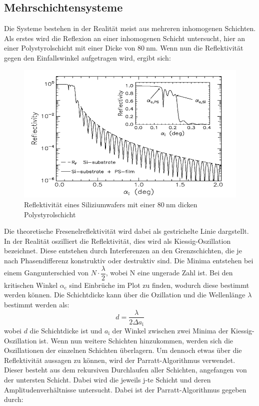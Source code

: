 \subsection{Mehrschichtensysteme}
\label{sec:Mehrschichtensysteme}
Die Systeme bestehen in der Realität meist aus mehreren inhomogenen Schichten. Als erstes wird die Reflexion an einer inhomogenen Schicht untersucht, hier an einer Polystyrolschicht mit einer Dicke von $\SI{80}{\nano\meter}$. Wenn nun die Reflektivität gegen den Einfallswinkel aufgetragen wird, ergibt sich:
\begin{figure}[h!]
  \label{fig:kiessig}
  \centering
  \includegraphics[scale=0.4]{fig/kiessing.png}
  \caption{Reflektivität eines Siliziumwafers mit einer $\SI{80}{\nano\meter}$ dicken Polystyrolschicht \cite[8]{Anleitung3}}
\end{figure}
\FloatBarrier
\noindent Die theoretische Fresenelreflektivität wird dabei als gestrichelte Linie dargstellt. In der Realität oszilliert die Reflektivität, dies wird als Kiessig-Oszillation bezeichnet. Diese entstehen durch Interferenzen an den Grenzschichten, die je nach Phasendifferenz konstruktiv oder destruktiv sind. Die Minima entstehen bei einem Gangunterschied von $N\cdot\dfrac{\lambda}{2}$, wobei N eine ungerade Zahl ist. Bei den kritischen Winkel $\alpha_\mathrm{c}$ sind Einbrüche im Plot zu finden, wodurch diese bestimmt werden können. Die Schichtdicke kann über die Ozillation und die Wellenlänge $\lambda$ bestimmt werden als:
\begin{equation}
  \label{eqn:Schichtdicke}
d = \dfrac{\lambda}{2\Delta a_\mathrm{i}}
\end{equation}
wobei $d$ die Schichtdicke ist und  $a_\mathrm{i}$ der Winkel zwischen zwei Minima der Kiessig-Oszillation ist.
Wenn nun weitere Schichten hinzukommen, werden sich die Oszillationen der einzelnen Schichten überlagern. Um dennoch etwas über die Reflektivität aussagen zu können, wird der Parratt-Algorithmus verwendet. Dieser besteht aus dem rekursiven Durchlaufen aller Schichten, angefangen von der untersten Schicht. Dabei wird die jeweils j-te Schicht und deren Amplitudenverhältnisse untersucht. Dabei ist der Parratt-Algorithmus gegeben durch:
